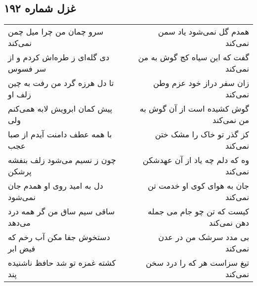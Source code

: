 \begin{center}
\section*{غزل شماره ۱۹۲}
\label{sec:sh192}
\begin{longtable}{l p{0.5cm} r}
سرو چمان من چرا میل چمن نمی‌کند
&&
همدم گل نمی‌شود یاد سمن نمی‌کند
\\
دی گله‌ای ز طره‌اش کردم و از سر فسوس
&&
گفت که این سیاه کج گوش به من نمی‌کند
\\
تا دل هرزه گرد من رفت به چین زلف او
&&
زان سفر دراز خود عزم وطن نمی‌کند
\\
پیش کمان ابرویش لابه همی‌کنم ولی
&&
گوش کشیده است از آن گوش به من نمی‌کند
\\
با همه عطف دامنت آیدم از صبا عجب
&&
کز گذر تو خاک را مشک ختن نمی‌کند
\\
چون ز نسیم می‌شود زلف بنفشه پرشکن
&&
وه که دلم چه یاد از آن عهدشکن نمی‌کند
\\
دل به امید روی او همدم جان نمی‌شود
&&
جان به هوای کوی او خدمت تن نمی‌کند
\\
ساقی سیم ساق من گر همه درد می‌دهد
&&
کیست که تن چو جام می جمله دهن نمی‌کند
\\
دستخوش جفا مکن آب رخم که فیض ابر
&&
بی مدد سرشک من در عدن نمی‌کند
\\
کشته غمزه تو شد حافظ ناشنیده پند
&&
تیغ سزاست هر که را درد سخن نمی‌کند
\\
\end{longtable}
\end{center}
